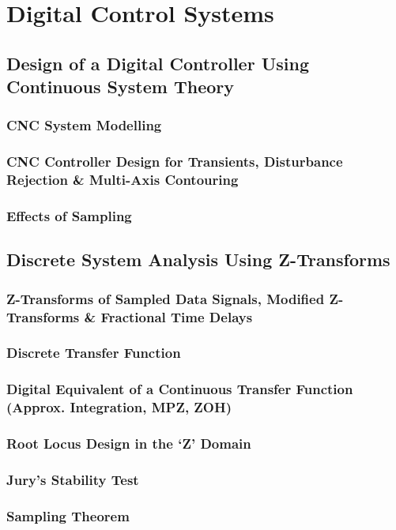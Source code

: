 \chapter{Digital Control Systems}


\newpage
\section{Design of a Digital Controller Using Continuous System Theory}
\subsection{CNC System Modelling}
\subsection{CNC Controller Design for Transients, Disturbance Rejection \& Multi-Axis Contouring}
\subsection{Effects of Sampling}

\newpage
\section{Discrete System Analysis Using Z-Transforms}
\subsection{Z-Transforms of Sampled Data Signals, Modified Z-Transforms \& Fractional Time Delays}
\subsection{Discrete Transfer Function}
\subsection{Digital Equivalent of a Continuous Transfer Function (Approx. Integration, MPZ, ZOH)}
\subsection{Root Locus Design in the ‘Z’ Domain}
\subsection{Jury’s Stability Test}
\subsection{Sampling Theorem}

